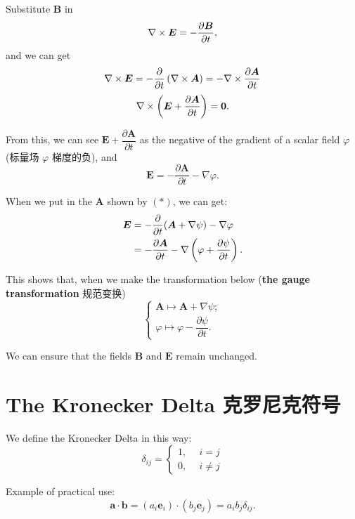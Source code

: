 Substitute \(\boldsymbol B\) in
\[\nabla \times \boldsymbol E = -{\partial \boldsymbol B \over \partial t},\]
and we can get
\[\nabla \times \boldsymbol E = - {\partial \over \partial t} \left( \nabla \times \boldsymbol A \right) = - \nabla \times {\partial \boldsymbol A \over \partial t}\]
\[\nabla \times \left(\boldsymbol E + {\partial \boldsymbol A \over \partial t} \right) = \boldsymbol 0.\]

From this, we can see
\(\boldsymbol E + \dfrac{\partial \boldsymbol A }{ \partial t}\) as the
negative of the gradient of a scalar field \(\varphi\) (标量场
\(\varphi\) 梯度的负), and
\[\boldsymbol E = - \dfrac{\partial \boldsymbol A }{ \partial t} - \nabla \varphi.\]

When we put in the \(\boldsymbol A\) shown by \((*)\), we can get:
\begin{align*}
    \boldsymbol E & = - \dfrac{\partial}{ \partial t}(\boldsymbol A + \nabla \psi) - \nabla \varphi \\
    & = - \dfrac{\partial \boldsymbol A }{ \partial t} - \nabla \left(\varphi + {\partial \psi \over \partial t}\right).
\end{align*}

This shows that, when we make the transformation below (\textbf{the gauge transformation} 规范变换) \[\left\{
    \begin{array} {l}
        \boldsymbol A \mapsto \boldsymbol A + \nabla \psi; \\
        \varphi \mapsto \varphi - \dfrac{\partial \psi}{\partial t}.
    \end{array}
\right.\]

We can ensure that the fields \(\boldsymbol B\) and \(\boldsymbol E\)
remain unchanged.

\section{The Kronecker Delta
克罗尼克符号}\label{the-kronecker-delta-ux514bux7f57ux5c3cux514bux7b26ux53f7}

We define the Kronecker Delta in this way: \[\delta_{ij} = \left\{
    \begin{aligned}
        1,\ \ &i = j \\
        0,\ \ &i \neq j
    \end{aligned}
\right.\]

Example of practical use:
\[\boldsymbol a \cdot \boldsymbol b = (a_i \boldsymbol e_i) \cdot (b_j \boldsymbol e_j) = a_ib_j \delta_{ij}.\]

